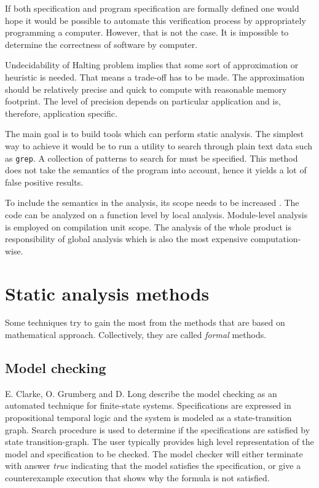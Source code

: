 \documentclass[12pt,final,oneside]{fithesis2}
\theoremstyle{definition}
\begin{document}
If both specification and program specification are formally defined one
would hope it would be possible to automate this verification process by
appropriately programming a computer. However, that is not the case.
It is impossible to determine the correctness of software by computer.

Undecidability of Halting problem implies that some sort of approximation
or heuristic is needed. That means a trade-off has to be made. The
approximation should be relatively precise and quick to compute with
reasonable memory footprint. The level of precision depends on particular
application and is, therefore, application specific.

The main goal is to build tools which can perform static analysis. The
simplest way to achieve it would be to run a utility to search through
plain text data such as \texttt{grep}. A collection of patterns to search
for must be specified. This method does not take the semantics of the
program into account, hence it yields a lot of false positive results.

To include the semantics in the analysis, its scope needs to be increased
\cite{Chess04-1}. The code can be analyzed on a function level by local
analysis. Module-level analysis is employed on compilation unit scope.
The analysis of the whole product is responsibility of global analysis
which is also the most expensive computation-wise.


\section{Static analysis methods}

Some techniques try to gain the most from the methods that are based
on mathematical approach. Collectively, they are called \textit{formal}
methods.


\subsection{Model checking}

E. Clarke, O. Grumberg and D. Long \cite{Clarke99-1} describe the model
checking as an automated technique for finite-state systems. Specifications
are expressed in propositional temporal logic and the system is modeled
as a state-transition graph. Search procedure is used to determine if the
specifications are satisfied by state transition-graph. The user typically
provides high level representation of the model and specification to be
checked. The model checker will either terminate with answer \textit{true}
indicating that the model satisfies the specification, or give
a counterexample execution that shows why the formula is not satisfied.
\end{document}
